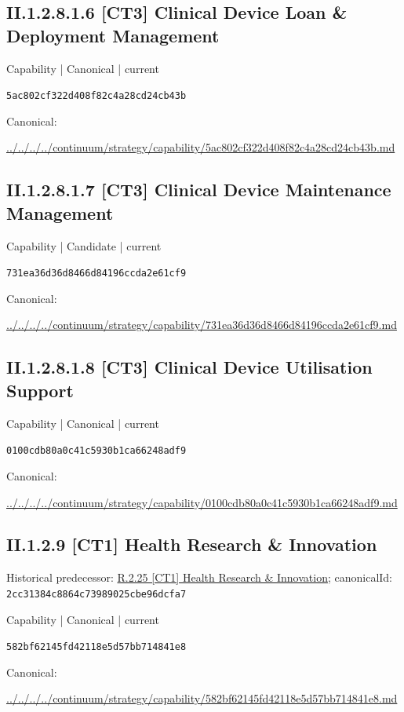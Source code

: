 \documentclass[10pt,a4paper]{article}
\begin{document}
\subsection*{II.1.2.8.1.6 [CT3] Clinical Device Loan \& Deployment Management}
\label{element-5ac802cf322d408f82c4a28cd24cb43b}
{\small Capability | Canonical | current}\par
\texttt{5ac802cf322d408f82c4a28cd24cb43b}\par
Canonical: \par
{\footnotesize\url{../../../../continuum/strategy/capability/5ac802cf322d408f82c4a28cd24cb43b.md}}\par
\subsection*{II.1.2.8.1.7 [CT3] Clinical Device Maintenance Management}
\label{element-731ea36d36d8466d84196ccda2e61cf9}
{\small Capability | Candidate | current}\par
\texttt{731ea36d36d8466d84196ccda2e61cf9}\par
Canonical: \par
{\footnotesize\url{../../../../continuum/strategy/capability/731ea36d36d8466d84196ccda2e61cf9.md}}\par
\subsection*{II.1.2.8.1.8 [CT3] Clinical Device Utilisation Support}
\label{element-0100cdb80a0c41c5930b1ca66248adf9}
{\small Capability | Canonical | current}\par
\texttt{0100cdb80a0c41c5930b1ca66248adf9}\par
Canonical: \par
{\footnotesize\url{../../../../continuum/strategy/capability/0100cdb80a0c41c5930b1ca66248adf9.md}}\par
\subsection*{II.1.2.9 [CT1] Health Research \& Innovation}
Historical predecessor: \hyperref[element-2cc31384c8864c73989025cbe96dcfa7]{R.2.25 [CT1] Health Research \& Innovation}; canonicalId: \texttt{2cc31384c8864c73989025cbe96dcfa7}\par
\label{element-582bf62145fd42118e5d57bb714841e8}
{\small Capability | Canonical | current}\par
\texttt{582bf62145fd42118e5d57bb714841e8}\par
Canonical: \par
{\footnotesize\url{../../../../continuum/strategy/capability/582bf62145fd42118e5d57bb714841e8.md}}\par
\end{document}
